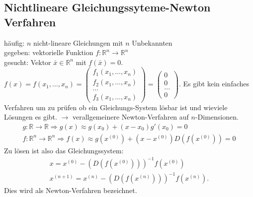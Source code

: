 \documentclass{scrartcl}
\begin{document}
\subsection{Nichtlineare Gleichungssyteme-Newton Verfahren}
häufig: $n$ nicht-lineare Gleichungen mit $n$ Unbekannten\\
gegeben: vektorielle Funktion  $f:\mathbb{R}^n \rightarrow \mathbb{R}^n$\\
gesucht: Vektor $\bar{x} \in \mathbb{R}^n$ mit $f(\bar{x})=0$.\\
$f(x)=f(x_1,...,x_n)= \begin{pmatrix}
f_1(x_1,...,x_n) \\
f_2(x_1,...,x_n) \\
...\\
f_3(x_1,...,x_n)
\end{pmatrix}= \begin{pmatrix}
0\\
0\\
...\\
0
\end{pmatrix}
$.
Es gibt kein einfaches Verfahren um zu prüfen ob ein Gleichungs-System lösbar ist und wieviele Lösungen es gibt.
$\rightarrow$ verallgemeinere Newton-Verfahren auf $n$-Dimensionen.
\begin{align*}
g: \mathbb{R} \rightarrow \mathbb{R} \Rightarrow g(x) \approx g(x_0)+ (x-x_0)g'(x_0)=0\\
f: \mathbb{R}^n \rightarrow \mathbb{R}^n \Rightarrow f(x) \approx g(x^{(0)})+ (x-x^{(0)})D(f(x^{(0)}))=0
\end{align*}
Zu lösen ist also das Gleichungssystem:
\begin{align*}
x=x^{(0)}-(D(f(x^{(0)})))^{-1} f(x^{(0)}) \\
x^{(n+1)}=x^{(n)}-(D(f(x^{(n)})))^{-1} f(x^{(n)}).
\end{align*}
Dies wird als Newton-Verfahren bezeichnet.
\end{document}
